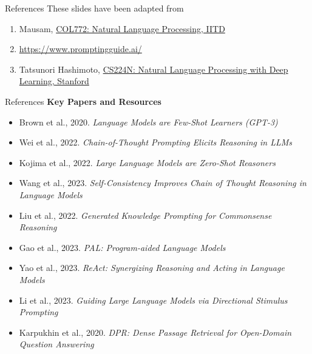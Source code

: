 \begin{frame}{References}
    \vspace{0.6em}
    These slides have been adapted from
    \begin{enumerate}
        \item Mausam, \href{https://www.cse.iitd.ac.in/~mausam/courses/col772/spring2026/}{COL772: Natural Language Processing, IITD}
        \item \href{https://www.promptingguide.ai/}{https://www.promptingguide.ai/}
        \item Tatsunori Hashimoto, \href{https://web.stanford.edu/class/cs224n/}{CS224N: Natural Language Processing with Deep Learning, Stanford}
    \end{enumerate}
\end{frame}

\begin{frame}[t]{References}
    \textbf{Key Papers and Resources}
    \scriptsize
    \begin{itemize}
        \setlength{\itemsep}{0pt}
        \setlength{\parskip}{0pt}
        \item[\textcolor{red}{$\triangleright$}] Brown et al., 2020. \textit{Language Models are Few-Shot Learners (GPT-3)}
        \item[\textcolor{red}{$\triangleright$}] Wei et al., 2022. \textit{Chain-of-Thought Prompting Elicits Reasoning in LLMs}
        \item[\textcolor{red}{$\triangleright$}] Kojima et al., 2022. \textit{Large Language Models are Zero-Shot Reasoners}
        \item[\textcolor{red}{$\triangleright$}] Wang et al., 2023. \textit{Self-Consistency Improves Chain of Thought Reasoning in Language Models}
        \item[\textcolor{red}{$\triangleright$}] Liu et al., 2022. \textit{Generated Knowledge Prompting for Commonsense Reasoning}
        \item[\textcolor{red}{$\triangleright$}] Gao et al., 2023. \textit{PAL: Program-aided Language Models}
        \item[\textcolor{red}{$\triangleright$}] Yao et al., 2023. \textit{ReAct: Synergizing Reasoning and Acting in Language Models}
        \item[\textcolor{red}{$\triangleright$}] Li et al., 2023. \textit{Guiding Large Language Models via Directional Stimulus Prompting}
        \item[\textcolor{red}{$\triangleright$}] Karpukhin et al., 2020. \textit{DPR: Dense Passage Retrieval for Open-Domain Question Answering}

\end{itemize}
\end{frame}
